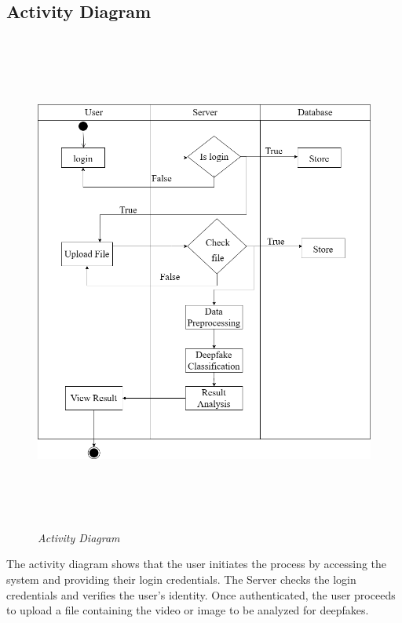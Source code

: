 
\subsection{Activity Diagram}
\begin{figure}[h]
    \centering
    \includegraphics[height=6.5in,width= 6in ]{img/activity diagram.drawio.png}
    \caption{\textit{Activity Diagram}}
\end{figure}
\justify
The activity diagram shows that the user initiates the process by accessing the system and providing their login credentials. The Server checks the login credentials and verifies the user's identity. Once authenticated, the user proceeds to upload a file containing the video or image to be analyzed for deepfakes.
